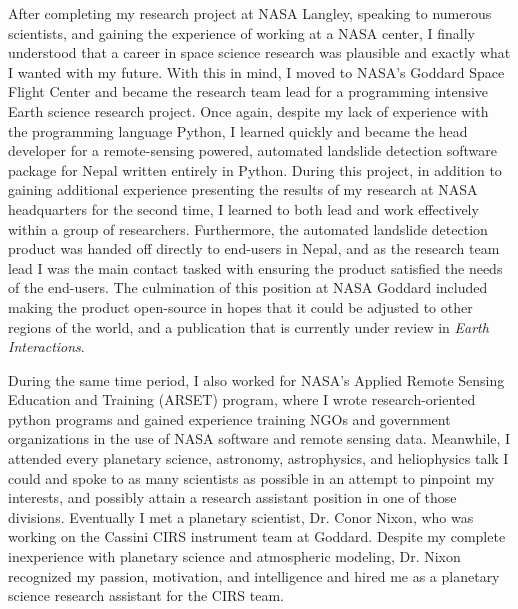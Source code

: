 After completing my research project  at NASA Langley, speaking to numerous
scientists, and gaining the experience of  working at a NASA center, I
finally  understood  that  a  career in  space  science  research  was
plausible and  exactly what  I wanted  with my  future.  With  this in
mind, I  moved to NASA's  Goddard Space  Flight Center and  became the
research team lead for a  programming intensive Earth science research
project.   Once  again,  despite  my   lack  of  experience  with  the
programming language  Python, I  learned quickly  and became  the head
developer for a remote-sensing  powered, automated landslide detection
software package  for Nepal written  entirely in Python.   During this
project, in  addition to gaining additional  experience presenting the
results of  my research at  NASA headquarters  for the second  time, I
learned  to  both  lead  and   work  effectively  within  a  group  of
researchers.  Furthermore,  the automated landslide  detection product
was handed  off directly to  end-users in  Nepal, and as  the research
team lead  I was  the main  contact tasked  with ensuring  the product
satisfied the needs of the end-users. The culmination of this position
at NASA Goddard  included making the  product open-source in hopes  that it
could be  adjusted to other  regions of  the world, and  a publication
that is currently under review in \textit{Earth Interactions}.

During the same  time period, I also worked for  NASA's Applied Remote
Sensing  Education  and  Training   (ARSET)  program,  where  I  wrote
research-oriented python programs and  gained experience training NGOs
and government  organizations in the  use of NASA software  and remote
sensing  data.    Meanwhile,  I  attended  every   planetary  science,
astronomy, astrophysics, and heliophysics talk I could and spoke to as
many scientists  as possible in  an attempt to pinpoint  my interests,
and  possibly attain  a research  assistant position  in one  of those
divisions. Eventually I  met a planetary scientist,  Dr.  Conor Nixon,
who   was   working  on   the   Cassini   CIRS  instrument   team   at
Goddard. Despite  my complete inexperience with  planetary science and
atmospheric modeling, Dr. Nixon recognized my passion, motivation, and
intelligence and  hired me as  a planetary science  research assistant
for the CIRS team.

